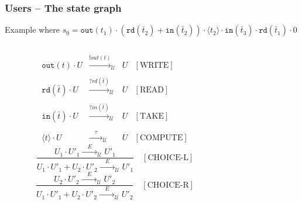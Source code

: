 \documentclass[handout]{beamer}\mode<presentation>{\usetheme{AMSCesenaBleu}}
\begin{document}
\begin{frame}
\frametitle{Users -- The state graph}
    
    Example where \alert{$s_0 = \mathtt{out}(t_1) \cdot (\mathtt{rd}(\bar{t}_2) + \mathtt{in}(\bar{t}_2)) \cdot \langle t_2 \rangle \cdot \mathtt{in}(\bar{t}_3) \cdot \mathtt{rd}(\bar{t}_1) \cdot 0$}

    \begin{columns}
        \begin{column}{.70\linewidth}
            \small
            \[\begin{array}{rclr}
                \mathtt{out}(t) \cdot U &\xrightarrow{!out(t)}_\mathcal{U}& U & [\text{WRITE}] \\
                \\
                \mathtt{rd}(\bar t) \cdot U &\xrightarrow{?rd(\bar t)}_\mathcal{U}& U & [\text{READ}] \\
                \\
                \mathtt{in}(\bar t) \cdot U &\xrightarrow{?in(\bar t)}_\mathcal{U}& U & [\text{TAKE}] \\
                \\
                \langle t \rangle \cdot U &\xrightarrow{\phantom{ab}\tau\phantom{ab}}_\mathcal{U}& U & [\text{COMPUTE}]
            \end{array}\]
            \[
                \frac{U_1 \cdot U'_1 \xrightarrow{\phantom{ab}E\phantom{ab}}_\mathcal{U} U'_1}{U_1 \cdot U'_1 + U_2 \cdot U'_2 \xrightarrow{\phantom{ab}E\phantom{ab}}_\mathcal{U} U'_1} \quad [\text{CHOICE-L}]
            \]
            \[
                \frac{U_2 \cdot U'_2 \xrightarrow{\phantom{ab}E\phantom{ab}}_\mathcal{U} U'_2}{U_1 \cdot U'_1 + U_2 \cdot U'_2 \xrightarrow{\phantom{ab}E\phantom{ab}}_\mathcal{U} U'_2} \quad [\text{CHOICE-R}]
            \]
        \end{column}
        \begin{column}{.30\linewidth}

\end{column}
\end{columns}
\end{frame}
\end{document}
